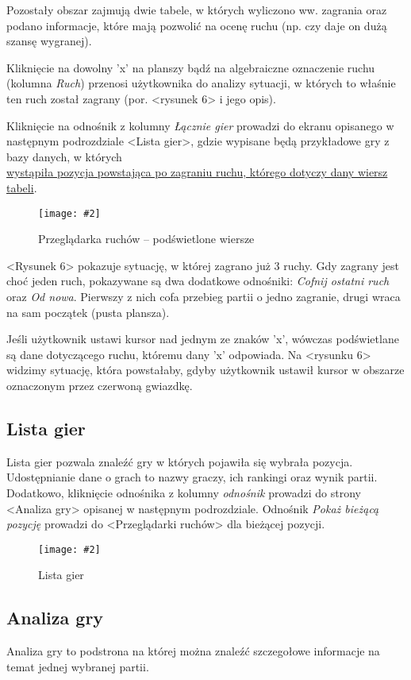 \documentclass[10pt,leqno]{article}
\newcommand{\myimage}[3]{
  \begin{figure}[h!]
    \centering
      \texttt{[image: \#2]}
  \caption{#3}
  \end{figure}
}
\begin{document}
Pozostały obszar zajmują dwie tabele, w których wyliczono ww. zagrania oraz podano informacje, które mają pozwolić na ocenę
ruchu (np. czy daje on dużą szansę wygranej).

Kliknięcie na dowolny 'x' na planszy bądź na algebraiczne oznaczenie ruchu (kolumna \emph{Ruch}) przenosi użytkownika do
analizy sytuacji, w których to właśnie ten ruch został zagrany (por. <rysunek 6> i jego opis).

Kliknięcie na odnośnik z kolumny \emph{Łącznie gier} prowadzi do ekranu opisanego w następnym podrozdziale <Lista gier>, 
gdzie wypisane będą przykładowe gry z bazy danych, w których \\ 
\underline{wystąpiła pozycja powstająca po zagraniu ruchu, którego dotyczy dany wiersz tabeli}.

\myimage{0.47}{moveBrowserMoveOver.png}{Przeglądarka ruchów -- podświetlone wiersze}

<Rysunek 6> pokazuje sytuację, w której zagrano już 3 ruchy. Gdy zagrany jest choć jeden ruch, pokazywane są dwa dodatkowe odnośniki:
\emph{Cofnij ostatni ruch} oraz \emph{Od nowa}. Pierwszy z nich cofa przebieg partii o jedno zagranie, drugi wraca na sam początek (pusta plansza).

Jeśli użytkownik ustawi kursor nad jednym ze znaków 'x', wówczas podświetlane są dane dotyczącego ruchu, któremu dany 'x' odpowiada.
Na <rysunku 6> widzimy sytuację, która powstałaby, gdyby użytkownik ustawił kursor w obszarze oznaczonym przez czerwoną gwiazdkę.

\newpage

\subsection{Lista gier}
Lista gier pozwala znaleźć gry w których pojawiła się wybrała pozycja. Udostępnianie dane o grach to nazwy graczy, ich rankingi oraz wynik partii.
Dodatkowo, kliknięcie odnośnika z kolumny \emph{odnośnik} prowadzi do strony <Analiza gry> opisanej w następnym podrozdziale. Odnośnik 
\emph{Pokaż bieżącą pozycję} prowadzi do <Przeglądarki ruchów> dla bieżącej pozycji.

\myimage{0.47}{gameList.png}{Lista gier}

\subsection{Analiza gry}
Analiza gry to podstrona na której można znaleźć szczegołowe informacje na temat jednej wybranej partii.
\end{document}
